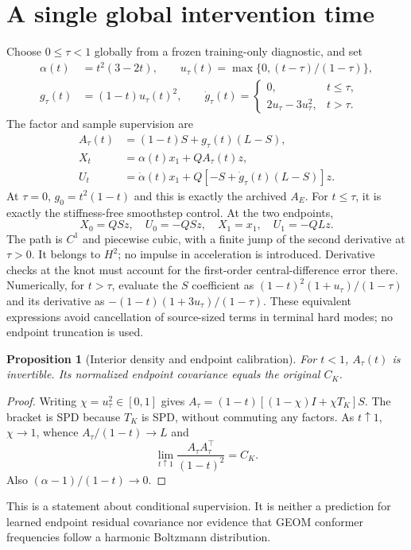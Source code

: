 \documentclass[11pt]{article}
\newtheorem{proposition}{Proposition}
\begin{document}
\section{A single global intervention time}
Choose $0\leq\tau<1$ globally from a frozen training-only diagnostic, and set
\begin{align}
 \alpha(t)&=t^2(3-2t),\qquad
 u_\tau(t)=\max\{0,(t-\tau)/(1-\tau)\},\nonumber\\
 g_\tau(t)&=(1-t)u_\tau(t)^2,\qquad
 \dot g_\tau(t)=
 \begin{cases}0,&t\leq\tau,\\2u_\tau-3u_\tau^2,&t>\tau.
 \end{cases}
 \label{eq:gate}
\end{align}
The factor and sample supervision are
\begin{align}
 A_\tau(t)&=(1-t)S+g_\tau(t)(L-S),\label{eq:factor}\\
 X_t&=\alpha(t)x_1+QA_\tau(t)z,\nonumber\\
 U_t&=\dot\alpha(t)x_1+
 Q[-S+\dot g_\tau(t)(L-S)]z.\label{eq:target}
\end{align}
At $\tau=0$, $g_0=t^2(1-t)$ and this is exactly the archived $A_E$.
For $t\leq\tau$, it is exactly the stiffness-free smoothstep control.
At the two endpoints,
\begin{equation}
 X_0=QSz,\quad U_0=-QSz,\quad X_1=x_1,\quad U_1=-QLz.
 \label{eq:endpoints}
\end{equation}
The path is $C^1$ and piecewise cubic, with a finite jump of the second
derivative at $\tau>0$. It belongs to $H^2$; no impulse in acceleration is
introduced. Derivative checks at the knot must account for the first-order
central-difference error there.
Numerically, for $t>\tau$, evaluate the $S$ coefficient as
$(1-t)^2(1+u_\tau)/(1-\tau)$ and its derivative as
$-(1-t)(1+3u_\tau)/(1-\tau)$. These equivalent expressions avoid cancellation
of source-sized terms in terminal hard modes; no endpoint truncation is used.

\begin{proposition}[Interior density and endpoint calibration]
For $t<1$, $A_\tau(t)$ is invertible. Its normalized endpoint covariance
equals the original $C_K$.
\end{proposition}
\begin{proof}
Writing $\chi=u_\tau^2\in[0,1]$ gives
$A_\tau=(1-t)[(1-\chi)I+\chi T_K]S$.
The bracket is SPD because $T_K$ is SPD, without commuting any factors.
As $t\uparrow1$, $\chi\to1$, whence $A_\tau/(1-t)\to L$ and
\begin{equation}
 \lim_{t\uparrow1}\frac{A_\tau A_\tau^\top}{(1-t)^2}=C_K.
 \label{eq:calibration}
\end{equation}
Also $(\alpha-1)/(1-t)\to0$.
\end{proof}
This is a statement about conditional supervision. It is neither a
prediction for learned endpoint residual covariance nor evidence that GEOM
conformer frequencies follow a harmonic Boltzmann distribution.
\end{document}
